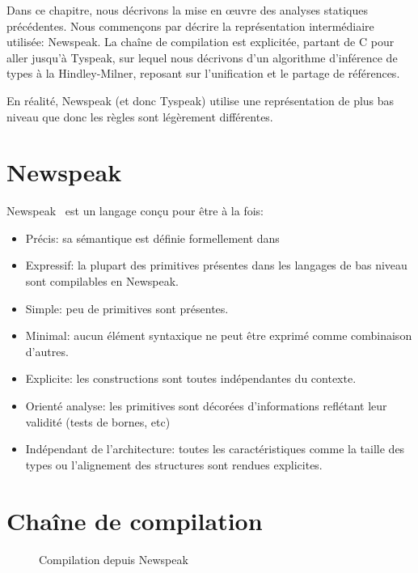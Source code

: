 Dans ce chapitre, nous décrivons la mise en œuvre des analyses statiques
précédentes. Nous commençons par décrire la représentation intermédiaire
utilisée: Newspeak. La chaîne de compilation est explicitée, partant de C pour
aller jusqu'à Tyspeak, sur lequel nous décrivons d'un algorithme d'inférence de
types à la Hindley-Milner, reposant sur l'unification et le partage de
références.

En réalité, Newspeak (et donc Tyspeak) utilise une représentation de plus bas
niveau que \langname donc les règles sont légèrement différentes.

\section{Newspeak}
\label{sec:npk}

Newspeak~\cite{newspeak} est un langage conçu pour être à la fois:

\begin{itemize}
  \item Précis: sa sémantique est définie formellement dans~\cite{newspeak}
  \item Expressif: la plupart des primitives présentes dans les
    langages de bas niveau sont compilables en Newspeak.
  \item Simple: peu de primitives sont présentes.
  \item Minimal: aucun élément syntaxique ne peut être exprimé
    comme combinaison d'autres.
  \item Explicite: les constructions sont toutes indépendantes du
    contexte.
  \item Orienté analyse: les primitives sont décorées d'informations
    reflétant leur validité (tests de bornes, etc)
  \item Indépendant de l'architecture: toutes les caractéristiques comme
    la taille des types ou l'alignement des structures sont rendues explicites.
\end{itemize}


\section{Chaîne de compilation}

\begin{figure}
  \centering
  
  \caption{Compilation depuis Newspeak}
\label{fig:compil-npk}
\end{figure}

